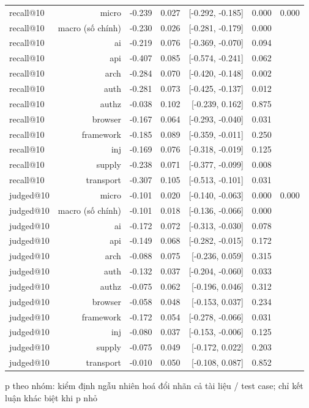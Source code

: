 \begin{table}[ht]
\begin{tabular}{lrrrrrr}
recall@10 & micro & -0.239 & 0.027 & [-0.292, -0.185] & 0.000 & 0.000 \\
recall@10 & macro (số chính) & -0.230 & 0.026 & [-0.281, -0.179] & 0.000 &  \\
recall@10 & ai & -0.219 & 0.076 & [-0.369, -0.070] & 0.094 &  \\
recall@10 & api & -0.407 & 0.085 & [-0.574, -0.241] & 0.062 &  \\
recall@10 & arch & -0.284 & 0.070 & [-0.420, -0.148] & 0.002 &  \\
recall@10 & auth & -0.281 & 0.073 & [-0.425, -0.137] & 0.012 &  \\
recall@10 & authz & -0.038 & 0.102 & [-0.239, 0.162] & 0.875 &  \\
recall@10 & browser & -0.167 & 0.064 & [-0.293, -0.040] & 0.031 &  \\
recall@10 & framework & -0.185 & 0.089 & [-0.359, -0.011] & 0.250 &  \\
recall@10 & inj & -0.169 & 0.076 & [-0.318, -0.019] & 0.125 &  \\
recall@10 & supply & -0.238 & 0.071 & [-0.377, -0.099] & 0.008 &  \\
recall@10 & transport & -0.307 & 0.105 & [-0.513, -0.101] & 0.031 &  \\
judged@10 & micro & -0.101 & 0.020 & [-0.140, -0.063] & 0.000 & 0.000 \\
judged@10 & macro (số chính) & -0.101 & 0.018 & [-0.136, -0.066] & 0.000 &  \\
judged@10 & ai & -0.172 & 0.072 & [-0.313, -0.030] & 0.078 &  \\
judged@10 & api & -0.149 & 0.068 & [-0.282, -0.015] & 0.172 &  \\
judged@10 & arch & -0.088 & 0.075 & [-0.236, 0.059] & 0.315 &  \\
judged@10 & auth & -0.132 & 0.037 & [-0.204, -0.060] & 0.033 &  \\
judged@10 & authz & -0.075 & 0.062 & [-0.196, 0.046] & 0.312 &  \\
judged@10 & browser & -0.058 & 0.048 & [-0.153, 0.037] & 0.234 &  \\
judged@10 & framework & -0.172 & 0.054 & [-0.278, -0.066] & 0.031 &  \\
judged@10 & inj & -0.080 & 0.037 & [-0.153, -0.006] & 0.125 &  \\
judged@10 & supply & -0.075 & 0.049 & [-0.172, 0.022] & 0.203 &  \\
judged@10 & transport & -0.010 & 0.050 & [-0.108, 0.087] & 0.852 &  \\
\bottomrule
\end{tabular}
\par\smallskip\footnotesize p theo nhóm: kiểm định ngẫu nhiên hoá đổi nhãn cả tài liệu / test case; chỉ kết luận khác biệt khi p nhỏ
\end{table}

